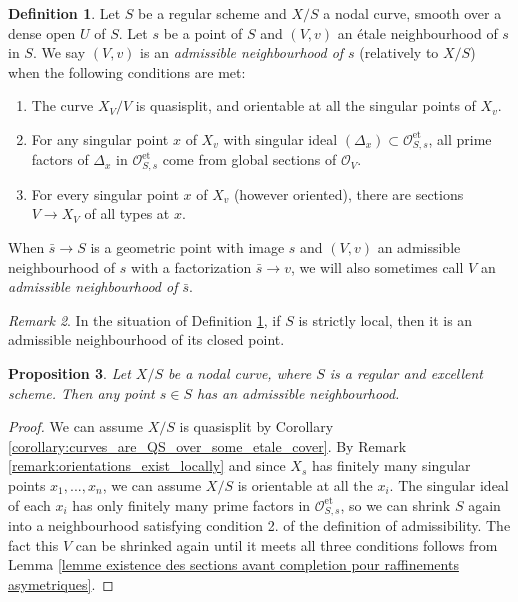 \documentclass[a4paper,12pt]{amsart} %
\numberwithin{equation}{subsection}
\newcommand{\on}[1]{\operatorname{#1}}
\theoremstyle{definition}
\newtheorem{definition}{Definition}[section]
\theoremstyle{plain}%
\newtheorem{proposition}[definition]{Proposition}
\theoremstyle{remark}
\newtheorem{remark}[definition]{Remark}
\renewcommand{\O}{\mathcal{O}}
\begin{document}
\begin{definition}\label{definition:admissible}
Let $S$ be a regular scheme and $X/S$ a nodal curve, smooth over a dense open $U$ of $S$. Let $s$ be a point of $S$ and $(V,v)$ an \'etale neighbourhood of $s$ in $S$. We say $(V,v)$ is an \emph{admissible neighbourhood of $s$} (relatively to $X/S$) when the following conditions are met:
\begin{enumerate}
\item The curve $X_V/V$ is quasisplit, and orientable at all the singular points of $X_v$.
\item For any singular point $x$ of $X_v$ with singular ideal $(\Delta_x)\subset\O_{S,s}^{\on{et}}$, all prime factors of $\Delta_x$ in $\O_{S,s}^{\on{et}}$ come from global sections of $\O_V$.
\item For every singular point $x$ of $X_v$ (however oriented), there are sections $V\to X_V$ of all types at $x$.
\end{enumerate}
When $\bar s \to S$ is a geometric point with image $s$ and $(V,v)$ an admissible neighbourhood of $s$ with a factorization $\bar s \to v$, we will also sometimes call $V$ an \emph{admissible neighbourhood of $\bar s$}.
\end{definition}

\begin{remark}\label{remark:strictly_local_schemes_are_admissible}
In the situation of Definition \ref{definition:admissible}, if $S$ is strictly local, then it is an admissible neighbourhood of its closed point.
\end{remark}


\begin{proposition}\label{proposition:admissibles_are_a_basis}
Let $X/S$ be a nodal curve, where $S$ is a regular and excellent scheme. Then any point $s\in S$ has an admissible neighbourhood.
\end{proposition}

\begin{proof}
We can assume $X/S$ is quasisplit by Corollary \ref{corollary:curves_are_QS_over_some_etale_cover}. By Remark \ref{remark:orientations_exist_locally} and since $X_s$ has finitely many singular points $x_1,...,x_n$, we can assume $X/S$ is orientable at all the $x_i$. The singular ideal of each $x_i$ has only finitely many prime factors in $\O_{S,s}^{\on{et}}$, so we can shrink $S$ again into a neighbourhood satisfying condition 2. of the definition of admissibility. The fact this $V$ can be shrinked again until it meets all three conditions follows from Lemma \ref{lemme existence des sections avant completion pour raffinements asymetriques}.
\end{proof}
\end{document}
